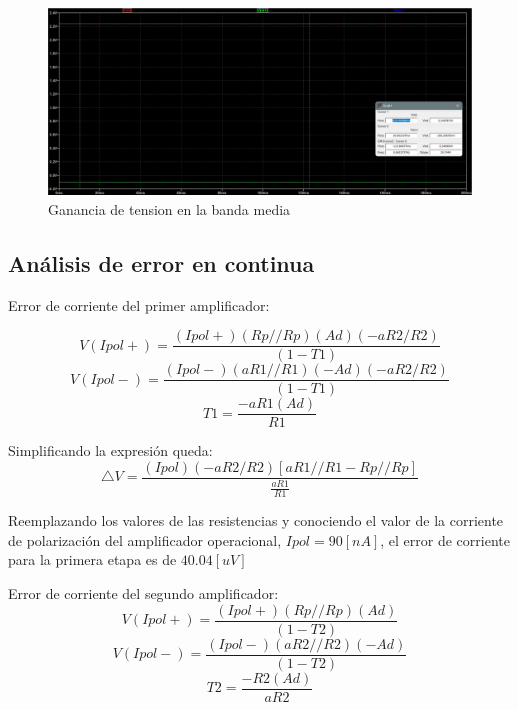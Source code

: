 \documentclass[12pt]{article}
\begin{document}
	\begin{figure}
		\includegraphics[width=\linewidth]{Imagenes_simulaciones/Sim_Ganancia_C2}
		\caption[Ganancia de tensión en la banda media]{Ganancia de tension en la banda media}
		\label{fig:simgananciac2}
	\end{figure}
	
	\subsection{Análisis de error en continua}
	Error de corriente del primer amplificador:
	
	\begin{equation}
		V(Ipol+)=\frac{(Ipol+)(Rp//Rp)(Ad)(-aR2/R2)}{(1-T1)}
	\end{equation}
	\begin{equation}
		V(Ipol-)=\frac{(Ipol-)(aR1//R1)(-Ad)(-aR2/R2)}{(1-T1)}
	\end{equation}
	\begin{equation}
		T1=\frac{-aR1(Ad)}{R1}
	\end{equation}
	
	Simplificando la expresión queda:
	\begin{equation}
		\bigtriangleup V= \frac{(Ipol)(-aR2/R2)[aR1//R1-Rp//Rp]}{\frac{aR1}{R1}}
	\end{equation}
	
	Reemplazando los valores de las resistencias y conociendo el valor de la corriente de polarización del amplificador operacional, $Ipol=90[nA]$, el error de corriente para la primera etapa es de $40.04[uV]$
	
	Error de corriente del segundo amplificador:
	\begin{equation}
		V(Ipol+)=\frac{(Ipol+)(Rp//Rp)(Ad)}{(1-T2)}
	\end{equation}
	\begin{equation}
		V(Ipol-)=\frac{(Ipol-)(aR2//R2)(-Ad)}{(1-T2)}
	\end{equation}
	\begin{equation}
		T2=\frac{-R2(Ad)}{aR2}
	\end{equation}
	
\end{document}
